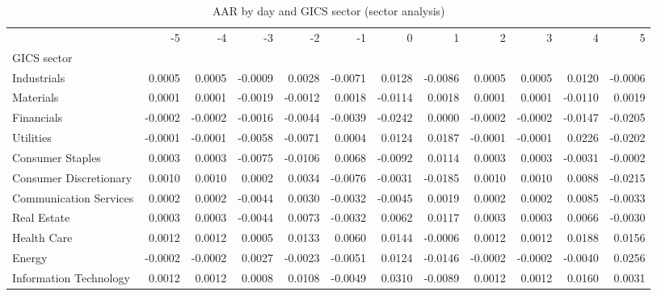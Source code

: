 \begin{table}
\caption{AAR by day and GICS sector (sector analysis)}
\label{tab:sector_aar}
\begin{tabular}{lrrrrrrrrrrr}
\toprule
 & -5 & -4 & -3 & -2 & -1 & 0 & 1 & 2 & 3 & 4 & 5 \\
GICS sector &  &  &  &  &  &  &  &  &  &  &  \\
\midrule
Industrials & 0.0005 & 0.0005 & -0.0009 & 0.0028 & -0.0071 & 0.0128 & -0.0086 & 0.0005 & 0.0005 & 0.0120 & -0.0006 \\
Materials & 0.0001 & 0.0001 & -0.0019 & -0.0012 & 0.0018 & -0.0114 & 0.0018 & 0.0001 & 0.0001 & -0.0110 & 0.0019 \\
Financials & -0.0002 & -0.0002 & -0.0016 & -0.0044 & -0.0039 & -0.0242 & 0.0000 & -0.0002 & -0.0002 & -0.0147 & -0.0205 \\
Utilities & -0.0001 & -0.0001 & -0.0058 & -0.0071 & 0.0004 & 0.0124 & 0.0187 & -0.0001 & -0.0001 & 0.0226 & -0.0202 \\
Consumer Staples & 0.0003 & 0.0003 & -0.0075 & -0.0106 & 0.0068 & -0.0092 & 0.0114 & 0.0003 & 0.0003 & -0.0031 & -0.0002 \\
Consumer Discretionary & 0.0010 & 0.0010 & 0.0002 & 0.0034 & -0.0076 & -0.0031 & -0.0185 & 0.0010 & 0.0010 & 0.0088 & -0.0215 \\
Communication Services & 0.0002 & 0.0002 & -0.0044 & 0.0030 & -0.0032 & -0.0045 & 0.0019 & 0.0002 & 0.0002 & 0.0085 & -0.0033 \\
Real Estate & 0.0003 & 0.0003 & -0.0044 & 0.0073 & -0.0032 & 0.0062 & 0.0117 & 0.0003 & 0.0003 & 0.0066 & -0.0030 \\
Health Care & 0.0012 & 0.0012 & 0.0005 & 0.0133 & 0.0060 & 0.0144 & -0.0006 & 0.0012 & 0.0012 & 0.0188 & 0.0156 \\
Energy & -0.0002 & -0.0002 & 0.0027 & -0.0023 & -0.0051 & 0.0124 & -0.0146 & -0.0002 & -0.0002 & -0.0040 & 0.0256 \\
Information Technology & 0.0012 & 0.0012 & 0.0008 & 0.0108 & -0.0049 & 0.0310 & -0.0089 & 0.0012 & 0.0012 & 0.0160 & 0.0031 \\
\bottomrule
\end{tabular}
\end{table}
